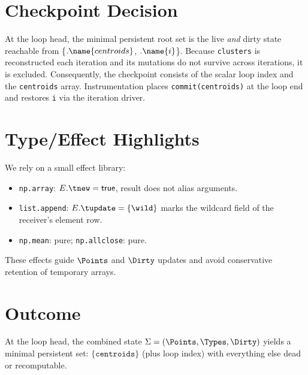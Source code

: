 \section*{Checkpoint Decision}
At the loop head, the minimal persistent root set is the live \emph{and} dirty state reachable from
\{\LOCALS$.\name{centroids}$, \LOCALS$.\name{i}$\}.
Because \texttt{clusters} is reconstructed each iteration and its mutations do not survive across iterations, it is excluded.
Consequently, the checkpoint consists of the scalar loop index and the \texttt{centroids} array.
Instrumentation places \verb|commit(centroids)| at the loop end and restores \verb|i| via the iteration driver.

\section*{Type/Effect Highlights}
We rely on a small effect library:
\begin{itemize}
\item \texttt{np.array}: $E.\tnew=\mathsf{true}$, result does not alias arguments.
\item \texttt{list.append}: $E.\tupdate=\{\wild\}$ marks the wildcard field of the receiver’s element row.
\item \texttt{np.mean}: pure; \texttt{np.allclose}: pure.
\end{itemize}
These effects guide $\Points$ and $\Dirty$ updates and avoid conservative retention of temporary arrays.

\section*{Outcome}
At the loop head, the combined state $\Sigma=(\Points,\Types,\Dirty)$ yields a minimal persistent set: $\{\texttt{centroids}\}$ (plus loop index) with everything else dead or recomputable.

